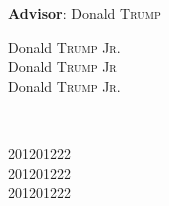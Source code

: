 \documentclass[12pt]{article}
\begin{document}
\begin{titlepage}
{\large \textbf{Advisor}: Donald \textsc{Trump}}\\[1.5 cm]

\begin{minipage}{0.4\textwidth}
\begin{flushleft} \large
Donald \textsc{Trump Jr.} \\
Donald \textsc{Trump Jr} \\
Donald  \textsc{Trump Jr.}
\end{flushleft}
\end{minipage}
~
\begin{minipage}{0.4\textwidth}
\begin{flushright} \large
201201222 \\
201201222 \\
201201222
\end{flushright}
\end{minipage}\\[0.5 cm]
 

\vfill %

\end{titlepage}



\addtocounter{page}{1}
\section*{}

\newpage


\section*{}

\newpage
\end{document}
